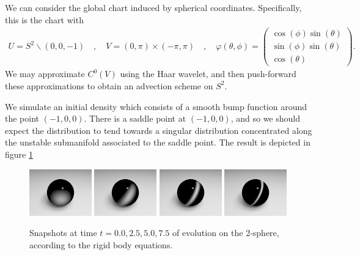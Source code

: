 \documentclass[letterpaper, 12 pt]{amsart}
\begin{document}
We can consider the global chart induced by spherical coordinates.
Specifically, this is the chart with
\begin{align*}
  U = S^2 \backslash (0,0,-1) \quad,\quad
  V = (0,\pi) \times (-\pi,\pi) \quad,\quad
  \varphi(\theta,\phi) = \begin{pmatrix}
    \cos(\phi) \sin(\theta) \\
    \sin(\phi) \sin(\theta) \\
    \cos(\theta)
    \end{pmatrix}.
\end{align*}
We may approximate $C^0(V)$ using the Haar wavelet,
and then push-forward these approximations
to obtain an advection scheme on $S^2$.

We simulate an initial density which consists of 
a smooth bump function around the point $(-1,0,0)$.
There is a saddle point at $(-1,0,0)$, and so 
we should expect the distribution to tend towards
a singular distribution concentrated along the unstable
submanifold associated to the saddle point.
The result is depicted in figure \ref{fig:sphere}

\begin{figure}[p]
  \centering
  \includegraphics[width=0.24\textwidth]{./images/sphere_t0}
  \includegraphics[width=0.24\textwidth]{./images/sphere_t2p5}
  \includegraphics[width=0.24\textwidth]{./images/sphere_t5}
  \includegraphics[width=0.24\textwidth]{./images/sphere_t7p5}
  \caption{Snapshots at time $t=0.0,2.5,5.0,7.5$ of evolution on the 2-sphere, according to the rigid body equations.}
  \label{fig:sphere}
\end{figure}
\end{document}
